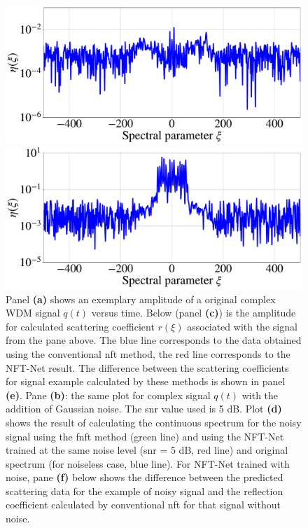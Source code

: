 \begin{figure}[htbp]
\begin{minipage}{.47\textwidth}
  \centering
  \includegraphics[width=1.\linewidth]{images/nn_nft/scirep_spectrum_diff_example.pdf}
\end{minipage}
\hfill
\begin{minipage}{.47\textwidth}
  \centering
  \includegraphics[width=1.\linewidth]{images/nn_nft/scirep_spectrum_diff_wn_example.pdf}
\end{minipage}


\caption{Panel \textbf{(a)} shows an exemplary amplitude of a original complex WDM signal $q(t)$ versus time. Below (panel \textbf{(c)}) is the amplitude for calculated scattering coefficient $r(\xi)$ associated with the signal from the pane above. The blue line corresponds to the data obtained using the conventional \acrshort{nft} method, the red line corresponds to the NFT-Net result. The difference between the scattering coefficients for signal example calculated by these methods is shown in panel \textbf{(e)}. Pane \textbf{(b)}: the same plot for complex signal $q(t)$ with the addition of Gaussian noise. The \acrshort{snr} value used is 5 dB. Plot \textbf{(d)} shows the result of calculating the continuous spectrum for the noisy signal using the \acrshort{fnft} method (green line) and using the NFT-Net trained at the same noise level (\acrshort{snr} = 5 dB, red line) and original spectrum (for noiseless case, blue line). For NFT-Net trained with noise, pane \textbf{(f)} below shows the difference between the predicted scattering data for the example of noisy signal and the reflection coefficient calculated by conventional \acrshort{nft} for that signal without noise.}
\label{fig:wdm_and_spectrum}
\end{figure}


